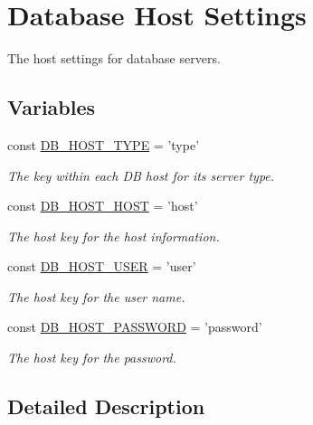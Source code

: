 \hypertarget{group__db__settings}{\section{Database Host Settings}
\label{group__db__settings}
}


The host settings for database servers.  


\subsection*{Variables}
\begin{DoxyCompactItemize}
\item 
const \hyperlink{group__db__settings_gace3d907644caa2a00fd88be83d7cd9f6}{D\-B\-\_\-\-H\-O\-S\-T\-\_\-\-T\-Y\-P\-E} = 'type'
\begin{DoxyCompactList}\small\item\em The key within each D\-B host for its server type. \end{DoxyCompactList}\item 
const \hyperlink{group__db__settings_ga25fb9cd75f17f870d6a1ddaf07f0f721}{D\-B\-\_\-\-H\-O\-S\-T\-\_\-\-H\-O\-S\-T} = 'host'
\begin{DoxyCompactList}\small\item\em The host key for the host information. \end{DoxyCompactList}\item 
const \hyperlink{group__db__settings_ga7bd8e811e8962d0012ef554ae225a477}{D\-B\-\_\-\-H\-O\-S\-T\-\_\-\-U\-S\-E\-R} = 'user'
\begin{DoxyCompactList}\small\item\em The host key for the user name. \end{DoxyCompactList}\item 
const \hyperlink{group__db__settings_gac58c46784855cd146a68b4aa1e092857}{D\-B\-\_\-\-H\-O\-S\-T\-\_\-\-P\-A\-S\-S\-W\-O\-R\-D} = 'password'
\begin{DoxyCompactList}\small\item\em The host key for the password. \end{DoxyCompactList}\end{DoxyCompactItemize}


\subsection{Detailed Description}


